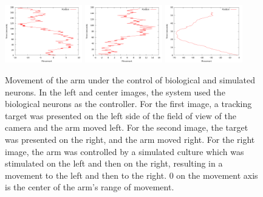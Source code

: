 \documentclass[letterpaper]{article}
\begin{document}
\begin{figure}
	\centering
	\includegraphics[width=0.3\textwidth]{bio_motion_446.png}
	\includegraphics[width=0.3\textwidth]{bio_motion_445.png}
	\includegraphics[width=0.3\textwidth]{simulated_motion.png}
	\caption{Movement of the arm under the control of biological and simulated neurons. In the left and center images, the system used the biological neurons as the controller. For the first image, a tracking target was presented on the left side of the field of view of the camera and the arm moved left. For the second image, the target was presented on the right, and the arm moved right. For the right image, the arm was controlled by a simulated culture which was stimulated on the left and then on the right, resulting in a movement to the left and then to the right. 0 on the movement axis is the center of the arm's range of movement.}
	\label{fig:motion_images}
\end{figure}
\end{document}
